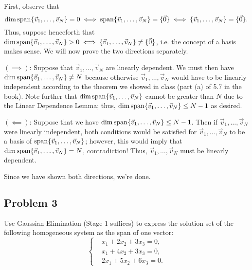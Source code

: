 \documentclass[main.tex]{subfiles}
\begin{document}
\begin{soln}
    First, observe that 
    \[\dim \operatorname{span}\{\vec{v}_1, \ldots , \vec{v}_N\} = 0\iff \operatorname{span}\{\vec{v}_1 , \ldots , \vec{v}_N\} = \{\vec{0}\} \iff \{\vec{v}_1, \ldots , \vec{v}_N\} = \{\vec{0}\}.\]
    Thus, suppose henceforth that $\dim \operatorname{span}\{\vec{v}_1, \ldots , \vec{v}_N\} > 0\iff \{\vec{v}_1, \ldots , \vec{v}_N\}\neq \{\vec{0}\}$, i.e. the concept of a basis makes sense. We will now prove the two directions separately.
    
    $(\implies)$: Suppose that $\vec{v}_1 , \ldots , \vec{v}_N$ are linearly dependent. We must then have $\dim\operatorname{span}\{\vec{v}_1 , \ldots , \vec{v}_N\}\neq N$ because otherwise $\vec{v}_1 , \ldots , \vec{v}_N$ would have to be linearly independent according to the theorem we showed in class (part (a) of 5.7 in the book). Note further that $\dim\operatorname{span}\{\vec{v}_1 , \ldots , \vec{v}_N\}$ cannot be greater than $N$ due to the Linear Dependence Lemma; thus, $\dim\operatorname{span}\{\vec{v}_1 , \ldots , \vec{v}_N\}\le N - 1$ as desired.
    
    $(\impliedby)$: Suppose that we have $\dim\operatorname{span}\{\vec{v}_1, \ldots , \vec{v}_N\} \le N - 1$. Then if $\vec{v}_1, \ldots , \vec{v}_N$ were linearly independent, both conditions would be satisfied for $\vec{v}_1, \ldots , \vec{v}_N$ to be a basis of $\operatorname{span}\{\vec{v}_1, \ldots , \vec{v}_N\}$; however, this would imply that $\dim\operatorname{span}\{\vec{v}_1, \ldots , \vec{v}_N\} = N$, contradiction! Thus, $\vec{v}_1, \ldots , \vec{v}_N$ must be linearly dependent.
    
    Since we have shown both directions, we're done.
\end{soln}
\eject

\subsection{Problem 3}
\begin{claim}
    Use Gaussian Elimination (Stage 1 suffices) to express the solution set of the following homogeneous system as the span of one vector:
    \[\left\{\begin{aligned}
        &x_1 + 2x_2 + 3x_3 = 0, \\
        &x_1 + 4x_2 + 3x_3 = 0, \\
        &2x_1 + 5x_2 + 6x_3 = 0.
    \end{aligned}\right.\]
\end{claim}
\end{document}
